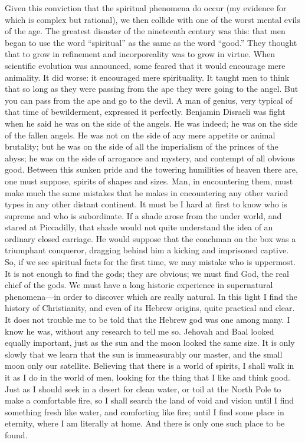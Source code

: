 \documentclass{book}
\begin{document}
Given this conviction that the spiritual phenomena do occur (my evidence for which is complex but rational), we then collide with one of the worst mental evils of the age. The greatest disaster of the nineteenth century was this: that men began to use the word “spiritual” as the same as the word “good.” They thought that to grow in refinement and incorporeality was to grow in virtue. When scientific evolution was announced, some feared that it would encourage mere animality. It did worse: it encouraged mere spirituality. It taught men to think that so long as they were passing from the ape they were going to the angel. But you can pass from the ape and go to the devil. A man of genius, very typical of that time of bewilderment, expressed it perfectly. Benjamin Disraeli was fight when he said he was on the side of the angels. He was indeed; he was on the side of the fallen angels. He was not on the side of any mere appetite or animal brutality; but he was on the side of all the imperialism of the princes of the abyss; he was on the side of arrogance and mystery, and contempt of all obvious good. Between this sunken pride and the towering humilities of heaven there are, one must suppose, spirits of shapes and sizes. Man, in encountering them, must make much the same mistakes that he makes in encountering any other varied types in any other distant continent. It must be I hard at first to know who is supreme and who is subordinate. If a shade arose from the under world, and stared at Piccadilly, that shade would not quite understand the idea of an ordinary closed carriage. He would suppose that the coachman on the box was a triumphant conqueror, dragging behind him a kicking and imprisoned captive. So, if we see spiritual facts for the first time, we may mistake who is uppermost. It is not enough to find the gods; they are obvious; we must find God, the real chief of the gods. We must have a long historic experience in supernatural phenomena—in order to discover which are really natural. In this light I find the history of Christianity, and even of its Hebrew origins, quite practical and clear. It does not trouble me to be told that the Hebrew god was one among many. I know he was, without any research to tell me so. Jehovah and Baal looked equally important, just as the sun and the moon looked the same size. It is only slowly that we learn that the sun is immeasurably our master, and the small moon only our satellite. Believing that there is a world of spirits, I shall walk in it as I do in the world of men, looking for the thing that I like and think good. Just as I should seek in a desert for clean water, or toil at the North Pole to make a comfortable fire, so I shall search the land of void and vision until I find something fresh like water, and comforting like fire; until I find some place in eternity, where I am literally at home. And there is only one such place to be found.
\end{document}
